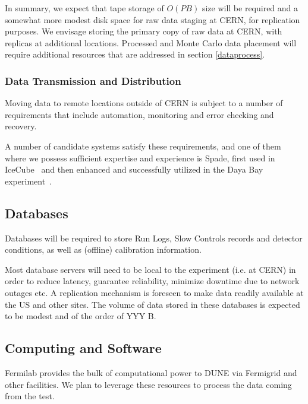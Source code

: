 In summary, we expect that tape storage of $O(PB)$ size will be required
and a somewhat more modest disk space for raw data staging at CERN, for replication purposes. 
We envisage storing the primary copy of raw data at CERN, with replicas at additional locations. 
%
Processed and Monte Carlo data placement will require additional resources that are addressed in section \ref{dataprocess}.


\subsubsection{Data Transmission and Distribution}
Moving data to remote locations outside of CERN is subject to a number of requirements that include
automation, monitoring and error checking and recovery. 

A number of candidate systems satisfy these requirements, and one of them where we possess sufficient expertise and experience 
is Spade, first used in IceCube~\cite{spade_icecube} and then enhanced and successfully utilized in the Daya Bay experiment~\cite{spade_dayabay}.


\subsection{Databases}
Databases will be required to store Run Logs, Slow Controls records and detector conditions, as well as (offline) calibration information.

Most database servers will need to be local to the experiment (i.e. at CERN) in order to reduce latency, guarantee reliability, minimize
downtime due to network outages etc. A replication mechanism is foreseen to make data readily available at the US and other sites.
The volume of data stored in these databases is expected to be modest and of the order of YYY B.

\subsection{Computing and Software}


Fermilab provides the bulk of computational power to DUNE via Fermigrid and other facilities. 
We plan to leverage these resources to process the data coming from the test.

